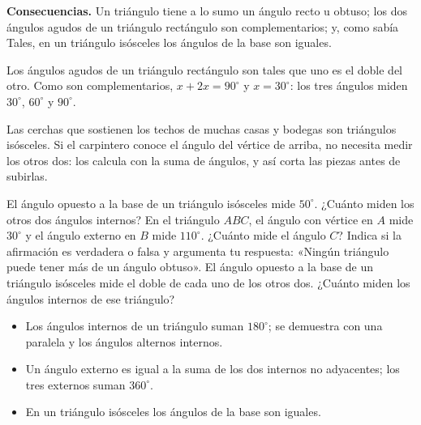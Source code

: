 \documentclass[11pt]{article}
\begin{document}
\textbf{Consecuencias.} Un triángulo tiene a lo sumo un ángulo recto u
obtuso; los dos ángulos agudos de un triángulo rectángulo son
complementarios; y, como sabía Tales, en un triángulo isósceles los ángulos
de la base son iguales.

\begin{ejemplo}
Los ángulos agudos de un triángulo rectángulo son tales que uno es el doble
del otro. Como son complementarios, $x + 2x = 90^\circ$ y $x = 30^\circ$:
los tres ángulos miden $30^\circ$, $60^\circ$ y $90^\circ$.
\end{ejemplo}

\begin{aplicacion}
Las cerchas que sostienen los techos de muchas casas y bodegas son
triángulos isósceles. Si el carpintero conoce el ángulo del vértice de
arriba, no necesita medir los otros dos: los calcula con la suma de
ángulos, y así corta las piezas antes de subirlas.
\end{aplicacion}

\begin{preguntas}
\pregunta El ángulo opuesto a la base de un triángulo isósceles mide
$50^\circ$. ¿Cuánto miden los otros dos ángulos internos?
\espacio{2cm}
\pregunta En el triángulo $ABC$, el ángulo con vértice en $A$ mide
$30^\circ$ y el ángulo externo en $B$ mide $110^\circ$. ¿Cuánto mide el
ángulo $C$?
\espacio{2.5cm}
\pregunta Indica si la afirmación es verdadera o falsa y argumenta tu
respuesta: «Ningún triángulo puede tener más de un ángulo obtuso».
\espacio{2.5cm}
\pregunta El ángulo opuesto a la base de un triángulo isósceles mide el
doble de cada uno de los otros dos. ¿Cuánto miden los ángulos internos de
ese triángulo?
\espacio{2.5cm}
\end{preguntas}

\begin{resumen}
\begin{itemize}
  \item Los ángulos internos de un triángulo suman $180^\circ$; se
        demuestra con una paralela y los ángulos alternos internos.
  \item Un ángulo externo es igual a la suma de los dos internos no
        adyacentes; los tres externos suman $360^\circ$.
  \item En un triángulo isósceles los ángulos de la base son iguales.
\end{itemize}
\end{resumen}
\end{document}
